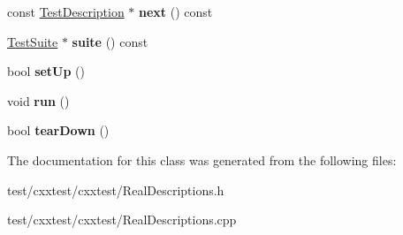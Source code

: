 \begin{DoxyCompactItemize}
\item 
\hypertarget{classCxxTest_1_1RealTestDescription_a4936c1b61cff064a4c74820c4dcb9974}{const \hyperlink{classCxxTest_1_1TestDescription}{Test\-Description} $\ast$ {\bfseries next} () const }\label{classCxxTest_1_1RealTestDescription_a4936c1b61cff064a4c74820c4dcb9974}

\item 
\hypertarget{classCxxTest_1_1RealTestDescription_a34edc597032beed1b685ad7a03138e46}{\hyperlink{classCxxTest_1_1TestSuite}{Test\-Suite} $\ast$ {\bfseries suite} () const }\label{classCxxTest_1_1RealTestDescription_a34edc597032beed1b685ad7a03138e46}

\item 
\hypertarget{classCxxTest_1_1RealTestDescription_ac53fd0156f865f77a55ca4b18c0427d2}{bool {\bfseries set\-Up} ()}\label{classCxxTest_1_1RealTestDescription_ac53fd0156f865f77a55ca4b18c0427d2}

\item 
\hypertarget{classCxxTest_1_1RealTestDescription_ac2f2ba1a9a9f503a6b0c783896c7273f}{void {\bfseries run} ()}\label{classCxxTest_1_1RealTestDescription_ac2f2ba1a9a9f503a6b0c783896c7273f}

\item 
\hypertarget{classCxxTest_1_1RealTestDescription_a50844cd37291d7da907db2a8e87540e4}{bool {\bfseries tear\-Down} ()}\label{classCxxTest_1_1RealTestDescription_a50844cd37291d7da907db2a8e87540e4}

\end{DoxyCompactItemize}


The documentation for this class was generated from the following files\-:\begin{DoxyCompactItemize}
\item 
test/cxxtest/cxxtest/Real\-Descriptions.\-h\item 
test/cxxtest/cxxtest/Real\-Descriptions.\-cpp\end{DoxyCompactItemize}
